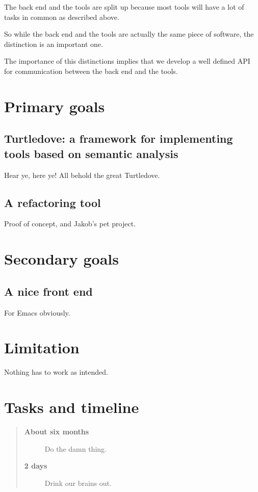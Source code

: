 \documentclass[a4paper,11pt,fleqn]{article}
\begin{document}
The back end and the tools are split up because most tools will have a lot of tasks in common as
described above.

So while the back end and the tools are actually the same piece of software, the distinction is an
important one.

The importance of this distinctions implies that we develop a well defined API for communication
between the back end and the tools.

\section{Primary goals}

\subsection{Turtledove: a framework for implementing tools based on semantic analysis}
Hear ye, here ye! All behold the great Turtledove.

\subsection{A refactoring tool}\label{primary_goals:a_refactoring_tool}
Proof of concept, and Jakob's pet project.

\section{Secondary goals}

\subsection{A nice front end}
For Emacs obviously.

\section{Limitation}
Nothing has to work as intended.

\section{Tasks and timeline}
\begin{quote}
\begin{description}
\item[\bf About six months] Do the damn thing.
\item[\bf 2 days] Drink our brains out.
\end{description}
\end{quote}
\end{document}
